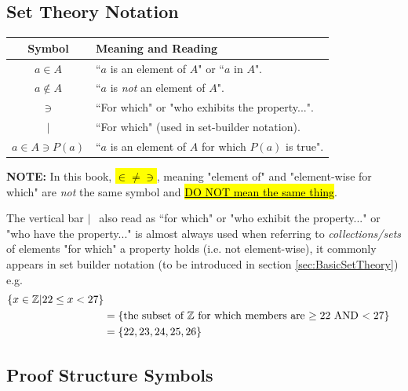 \subsection{Set Theory Notation}

\begin{center}
\begin{tabular}{|c|l|}
    \hline
    \textbf{Symbol} & \textbf{Meaning and Reading} \\
    \hline
    $a \in A$ & ``$a$ is an element of $A$" or ``$a$ in $A$". \index{$\in$} \\
    $a \not\in A$ & ``$a$ is \textit{not} an element of $A$". \index{$\not\in$} \\
    $\ni$ & ``For which" or "who exhibits the property...". \index{$\ni$}\\
    $|$ & ``For which" (used in set-builder notation). \\
    $a \in A \ni P(a)$ & ``$a$ is an element of $A$ for which $P(a)$ is true". \\
    \hline
\end{tabular}
\end{center}

\begin{tcolorbox}
\begin{center}
\textbf{NOTE:} In this book, \hl{$\in \neq \ni$}, meaning "element of" and "element-wise for which" are \textit{not} the same symbol and \underline{\hl{DO NOT mean the same thing}}.
\end{center}
\end{tcolorbox}

\noindent The vertical bar  $| \ \ $ also read as ``for which" or "who exhibit the property..." or "who have the property..." is almost always used when referring to \textit{collections/sets} of elements "for which" a property holds (i.e. not element-wise), it commonly appears in set builder notation (to be introduced in section \ref{sec:BasicSetTheory}) e.g. 
\begin{align}
    \{x\in {\mathbb{Z}} | 22\leq x < 27\}  \nonumber \\
    &= \{ \text{the subset of ${\mathbb{Z}}$ for which members are $\geq 22$ AND $<27$} \} \nonumber \\
    &= \{22,23,24,25,26\}\nonumber
\end{align}

\subsection{Proof Structure Symbols}

